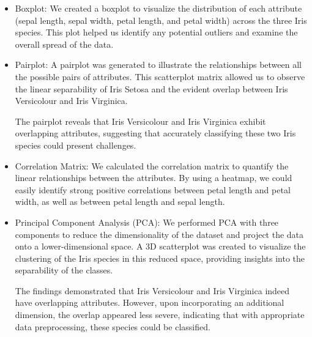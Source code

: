 \documentclass[conference]{inc/IEEEtran}
\begin{document}
\begin{itemize}
  \item Boxplot: We created a boxplot to visualize the distribution of each attribute (sepal length, sepal width,
  petal length, and petal width) across the three Iris species. This plot helped us identify any potential outliers
  and examine the overall spread of the data.
  \item Pairplot: A pairplot was generated to illustrate the relationships between all the possible pairs of attributes.
  This scatterplot matrix allowed us to observe the linear separability of Iris Setosa and the evident overlap between
  Iris Versicolour and Iris Virginica.

  The pairplot reveals that Iris Versicolour and Iris Virginica exhibit overlapping attributes, suggesting that accurately
  classifying these two Iris species could present challenges.

  \item Correlation Matrix: We calculated the correlation matrix to quantify the linear relationships between the attributes.
  By using a heatmap, we could easily identify strong positive correlations between petal length and petal width, as well as
  between petal length and sepal length.

  \item Principal Component Analysis (PCA): We performed PCA with three components to reduce the dimensionality of the dataset
  and project the data onto a lower-dimensional space. A 3D scatterplot was created to visualize the clustering of the Iris
  species in this reduced space, providing insights into the separability of the classes.
  
  The findings demonstrated that Iris Versicolour and Iris Virginica indeed have overlapping attributes. However, upon
  incorporating an additional dimension, the overlap appeared less severe, indicating that with appropriate data preprocessing,
  these species could be classified.
\end{itemize}
\end{document}
